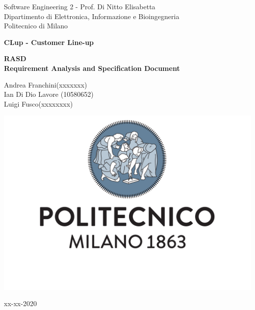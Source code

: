 \documentclass[a4paper]{article}
\begin{document}
\begin{titlepage}
	\centering
    
    {\normalsize 
        Software Engineering 2 - Prof. Di Nitto Elisabetta \\ 
		Dipartimento di Elettronica, Informazione e Bioingegneria \\
        Politecnico di Milano \par
    }     \vspace{3cm}

    {\Huge \textbf{CLup - Customer Line-up\\} }    \vspace{1cm}
  
    {\large \textbf{RASD\\Requirement Analysis and Specification Document} \par}     \vspace{4cm}

	{\normalsize Andrea Franchini(xxxxxxx) \\ Ian Di Dio Lavore (10580652)\\ Luigi Fusco(xxxxxxxx)\par}     \vspace{3cm}

    \includegraphics[scale=0.4]{images/logo.pdf}     \vspace{0.5cm}

	{\normalsize xx-xx-2020 \par}
	
\end{titlepage}

\listoftodos

\tableofcontents

    
    
    

    

    
\end{document}
